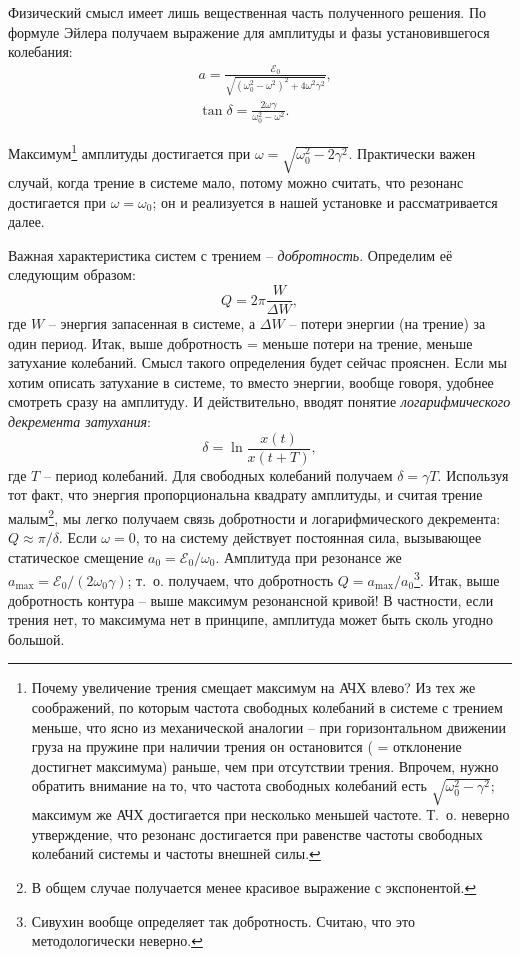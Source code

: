 \documentclass{../lab_class}
\newcommand{\ef}{\mathscr{E}}
\begin{document}
Физический смысл имеет лишь вещественная часть полученного решения. По формуле Эйлера получаем выражение для амплитуды и фазы установившегося колебания:
\begin{equation}\label{eq:ampl_phase}
\begin{aligned}
	&a = \frac{\ef_0}{\sqrt{(\omega_0^2 - \omega^2)^2 + 4 \omega^2 \gamma^2}}, \\
	&\tan{\delta} = \frac{2 \omega \gamma}{\omega_0^2 - \omega^2}.
\end{aligned}
\end{equation}

Максимум\footnote{Почему увеличение трения смещает максимум на АЧХ влево? Из тех же соображений, по которым частота свободных колебаний в системе с трением меньше, что ясно из механической аналогии -- при горизонтальном движении груза на пружине при наличии трения он остановится ( = отклонение достигнет максимума) раньше, чем при отсутствии трения. Впрочем, нужно обратить внимание на то, что частота свободных колебаний есть $\sqrt{\omega_0^2 - \gamma^2}$; максимум же АЧХ достигается при несколько меньшей частоте. Т.~о. неверно утверждение, что резонанс достигается при равенстве частоты свободных колебаний системы и частоты внешней силы.} амплитуды достигается при $\omega = \sqrt{\omega_0^2 - 2 \gamma^2}$. Практически важен случай, когда трение в системе мало, потому можно считать, что резонанс достигается при $\omega = \omega_0$; он и реализуется в нашей установке и рассматривается далее.

Важная характеристика систем с трением -- \emph{добротность}. Определим её следующим образом:
\begin{equation*}
	Q = 2 \pi \frac{W}{\Delta W},
\end{equation*}
где $W$ -- энергия запасенная в системе, а $\Delta W$ -- потери энергии (на трение) за один период. Итак, выше добротность = меньше потери на трение, меньше затухание колебаний. Смысл такого определения будет сейчас прояснен. Если мы хотим описать затухание в системе, то вместо энергии, вообще говоря, удобнее смотреть сразу на амплитуду. И действительно, вводят понятие \emph{логарифмического декремента затухания}:
\begin{equation*}
	\delta = \ln \frac{x(t)}{x(t+T)},
\end{equation*}
где $T$ -- период колебаний. Для свободных колебаний получаем $\delta = \gamma T$. Используя тот факт, что энергия пропорциональна квадрату амплитуды, и считая трение малым\footnote{В общем случае получается менее красивое выражение с экспонентой.}, мы легко получаем связь добротности и логарифмического декремента: $Q \approx \pi / \delta$. Если $\omega = 0$, то на систему действует постоянная сила, вызывающее статическое смещение $a_0 = \ef_0 / \omega_0$. Амплитуда при резонансе же $a_{\max} = \ef_0 / (2 \omega_0 \gamma)$; т.~о. получаем, что добротность $Q = a_{\max} / a_0$\footnote{Сивухин вообще определяет так добротность. Считаю, что это методологически неверно.}. Итак, выше добротность контура -- выше максимум резонансной кривой! В частности, если трения нет, то максимума нет в принципе, амплитуда может быть сколь угодно большой. 
\end{document}
